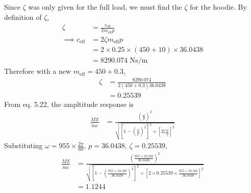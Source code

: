 \subsection{}
\subsubsection{}
Since $\zeta$ was only given for the full load, we must find the $\zeta$ for the hoodie. By definition of $\zeta$,
\begin{align*}
    \zeta &= \frac{c_{\text{eff}}}{2 m_{\text{eff}} p} \\
    \implies c_{\text{eff}} &= 2 \zeta m_{\text{eff}} p \\
    &= 2 \times 0.25 \times (450 + 10) \times 36.0438 \\
    &= 8290.074 \text{ Ns/m}
\end{align*}
Therefore with a new $m_{\text{eff}} = 450 + 0.3$, 
\begin{align*}
    \zeta &= \frac{8290.074}{2(450 + 0.3)36.0438} \\
    &= 0.25539 
\end{align*}
From eq. 5.22, the ampltitude response is 
\begin{align*}
    \frac{M \mathbb{X}}{\tilde{m} e} &= \frac{\left(\frac{\omega}{p}\right)^2}{\sqrt{\left[1 - \left(\frac{\omega}{p}\right)^2\right]^2 + \left[2 \zeta \frac{\omega}{p}\right]^2}} 
\end{align*}
Substituting $\omega = 955 \times \frac{2\pi}{60}$, $p = 36.0438$, $\zeta = 0.25539$,
\begin{align*}
    \frac{M \mathbb{X}}{\tilde{m} e} &= \frac{\left(\frac{955 \times 2\pi/60}{36.0438}\right)^2}{\sqrt{\left[1 - \left(\frac{955 \times 2\pi/60}{36.0438}\right)^2\right]^2 + \left[2 \times 0.25539 \times \frac{955 \times 2\pi/60}{36.0438}\right]^2}} \\
    &= \boxed{1.1244} 
\end{align*}

